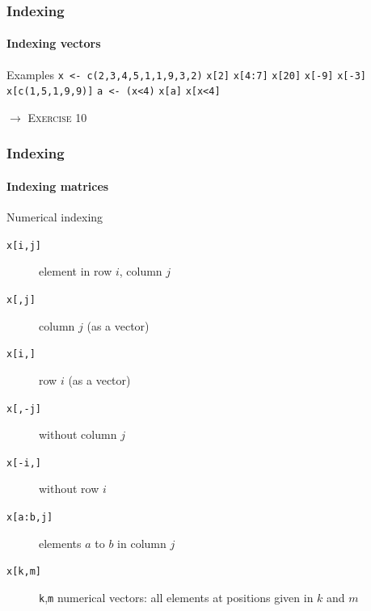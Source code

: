 \documentclass[title={Introduction to R}, author={Mutschler and Zaharieva}, inst={Institute for Econometrics and Empirical Economics}]{beamer}
\begin{document}
\begin{frame}
\frametitle{Indexing}
\framesubtitle{Indexing vectors}
\begin{block}{Examples}
\texttt{x <- c(2,3,4,5,1,1,9,3,2)}\newline
\texttt{x[2]}\newline
\texttt{x[4:7]}\newline
\texttt{x[20]}\newline
\texttt{x[-9]}\newline
\texttt{x[-3]}\newline
\texttt{x[c(1,5,1,9,9)]}\newline
\texttt{a <- (x<4)}\newline
\texttt{x[a]}\newline
\texttt{x[x<4]}
\end{block}\pause
$\longrightarrow $ \textsc{Exercise 10}
\end{frame}


\begin{frame}
\frametitle{Indexing}
\framesubtitle{Indexing matrices}
Numerical indexing
\begin{description}
\item[{\texttt{x[i,j]}}] element in row $i$, column $j$
\item[{\texttt{x[,j]}}] column $j$ (as a vector)
\item[{\texttt{x[i,]}}] row $i$ (as a vector)
\item[{\texttt{x[,-j]}}] without column $j$
\item[{\texttt{x[-i,]}}] without row $i$
\item[{\texttt{x[a:b,j]}}] elements $a$ to $b$ in column $j$
\item[{\texttt{x[k,m]}}] \texttt{k},\texttt{m} numerical vectors: all
elements at positions \newline
given in $k$ and $m$
\end{description}
\end{frame}
\end{document}
